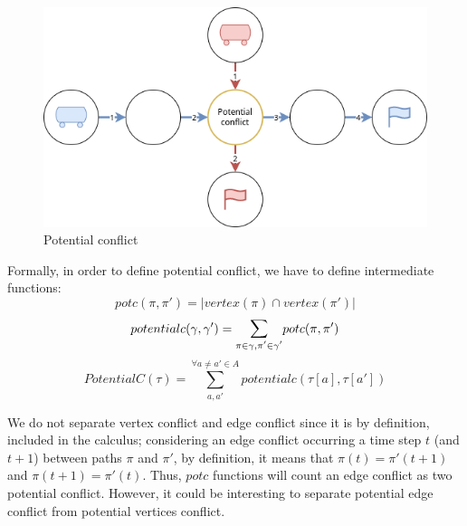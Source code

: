 \begin{figure}[H]
  \centering
  \caption{Potential conflict}\label{img:potential_conflict}
  \includegraphics[width=\widthimg]{img/potential_conflict.drawio.png}
\end{figure} 

Formally, in order to define potential conflict, we have to define intermediate functions: \[
  potc(\pi,\pi') = |vertex(\pi) \cap vertex(\pi')|
\]
\[
  potentialc(\gamma,\gamma') = \mathlarger{\sum}_{\pi \in \gamma,\pi' \in \gamma'}{
    potc(\pi,\pi')
}
\]
\[
    PotentialC(\tau)= \sum_{a,a'}^{\forall a \neq a' \in A}{
        potentialc(\tau[a],\tau[a'])
    }
\]


We do not separate vertex conflict and edge conflict since it is by definition, included in the calculus; considering an edge conflict occurring a time step \(t\) (and \(t+1\)) between paths \(\pi\) and \(\pi'\), by definition, it means that \(\pi(t) =\pi'(t+1)\) and \(\pi(t+1) =\pi'(t)\). Thus, \(potc\) functions will count an edge conflict as two potential conflict. However, it could be interesting to separate potential edge conflict from potential vertices conflict.







